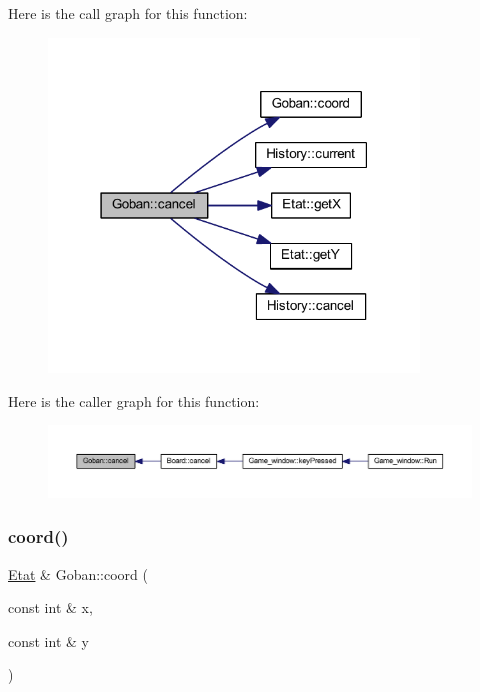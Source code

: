 Here is the call graph for this function\+:\nopagebreak
\begin{figure}[H]
\begin{center}
\leavevmode
\includegraphics[width=279pt]{class_goban_ae7ee3b39f3c0d28c9bca286ca538f8ac_cgraph}
\end{center}
\end{figure}
Here is the caller graph for this function\+:\nopagebreak
\begin{figure}[H]
\begin{center}
\leavevmode
\includegraphics[width=350pt]{class_goban_ae7ee3b39f3c0d28c9bca286ca538f8ac_icgraph}
\end{center}
\end{figure}
\mbox{\label{class_goban_a29aaf8df380fe614845d48cba057747c}} 
\subsubsection{\texorpdfstring{coord()}{coord()}\hspace{0.1cm}{\footnotesize\ttfamily [1/2]}}
{\footnotesize\ttfamily \hyperlink{class_etat}{Etat} \& Goban\+::coord (\begin{DoxyParamCaption}\item[{const int \&}]{x,  }\item[{const int \&}]{y }\end{DoxyParamCaption})}

